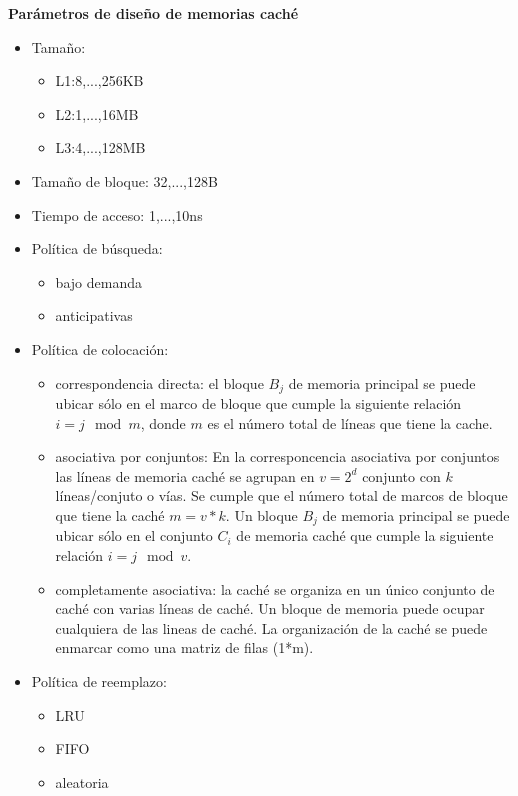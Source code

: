 \documentclass{article}
\begin{document}
\textbf{Parámetros de diseño de memorias caché}
\begin{itemize}
\item Tamaño:
	\begin{itemize}
	\item L1:8,...,256KB
	\item L2:1,...,16MB
	\item L3:4,...,128MB
	\end{itemize}
	
\item Tamaño de bloque: 32,...,128B

\item Tiempo de acceso: 1,...,10ns

\item Política de búsqueda:
	\begin{itemize}
	\item bajo demanda
	\item anticipativas
	\end{itemize}

\item Política de colocación:
	\begin{itemize}
	\item correspondencia directa: el bloque $B_j$ de memoria principal se puede ubicar sólo en el marco de bloque que cumple la siguiente relación $i=j\mod{m}$, donde $m$ es el número total de líneas que tiene la cache.
	
	\item asociativa por conjuntos: En la corresponcencia asociativa por conjuntos las líneas de memoria caché se agrupan en $v=2^d$ conjunto con $k$ líneas/conjuto o vías. Se cumple que el número total de marcos de bloque que tiene la caché $m=v*k$. Un bloque $B_j$ de memoria principal se puede ubicar sólo en el conjunto $C_i$ de memoria caché que cumple la siguiente relación $i=j\mod{v}$.
	
	\item completamente asociativa: la caché se organiza en un único conjunto de caché con varias líneas de caché. Un bloque de memoria puede ocupar cualquiera de las lineas de caché. La organización de la caché se puede enmarcar como una matriz de filas (1*m).
	\end{itemize}
	
\item Política de reemplazo:
	\begin{itemize}
	\item LRU
	\item FIFO
	\item aleatoria
	\end{itemize}


\end{itemize}
\end{document}
